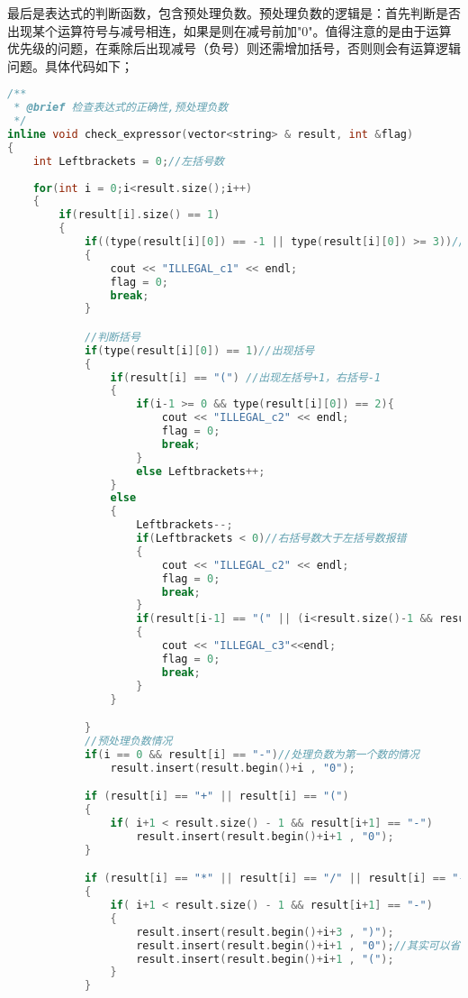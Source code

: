 \documentclass[fontset=fandol]{ctexart}
\begin{document}
最后是表达式的判断函数，包含预处理负数。预处理负数的逻辑是：首先判断是否出现某个运算符号与减号相连，如果是则在减号前加"0"。值得注意的是由于运算优先级的问题，在乘除后出现减号（负号）则还需增加括号，否则则会有运算逻辑问题。具体代码如下；
\begin{lstlisting}[language=C++, caption={check\_expressor()}]
/**
 * @brief 检查表达式的正确性,预处理负数
 */
inline void check_expressor(vector<string> & result, int &flag)
{
    int Leftbrackets = 0;//左括号数
    
    for(int i = 0;i<result.size();i++)
    {
        if(result[i].size() == 1)
        {
            if((type(result[i][0]) == -1 || type(result[i][0]) >= 3))//如果出现特殊符号，或者"."和“e”单独出现则报错
            {
                cout << "ILLEGAL_c1" << endl;
                flag = 0;
                break;
            }

            //判断括号
            if(type(result[i][0]) == 1)//出现括号
            {
                if(result[i] == "(") //出现左括号+1，右括号-1
                {
                    if(i-1 >= 0 && type(result[i][0]) == 2){
                        cout << "ILLEGAL_c2" << endl;
                        flag = 0;
                        break;
                    }
                    else Leftbrackets++;
                }
                else 
                {
                    Leftbrackets--;
                    if(Leftbrackets < 0)//右括号数大于左括号数报错
                    {
                        cout << "ILLEGAL_c2" << endl;
                        flag = 0;
                        break;
                    }
                    if(result[i-1] == "(" || (i<result.size()-1 && result[i+1] == "("))//"()"or")("
                    {
                        cout << "ILLEGAL_c3"<<endl;
                        flag = 0;
                        break;
                    }
                }

            }
            //预处理负数情况
            if(i == 0 && result[i] == "-")//处理负数为第一个数的情况
                result.insert(result.begin()+i , "0");

            if (result[i] == "+" || result[i] == "(")
            {
                if( i+1 < result.size() - 1 && result[i+1] == "-")
                    result.insert(result.begin()+i+1 , "0");
            }

            if (result[i] == "*" || result[i] == "/" || result[i] == "-")
            {
                if( i+1 < result.size() - 1 && result[i+1] == "-")
                {
                    result.insert(result.begin()+i+3 , ")");
                    result.insert(result.begin()+i+1 , "0");//其实可以省略只要加括号，后续遍历会回到上面一种情况
                    result.insert(result.begin()+i+1 , "(");
                }
            }


\end{lstlisting}
\end{document}
